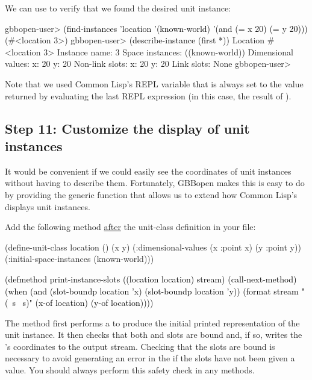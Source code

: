 \documentclass[10pt,twoside,english,pdftex]{article}
\begin{document}
%
%
We can use  to verify that we found the
desired  unit instance:
%
\W\supp
\begin{example}
\textcolor{darkergray}{%
  gbbopen-user> \textcolor{black}{(find-instances 'location '(known-world)
                  '(and (= x 20) (= y 20)))}
   (#<location 3>)
  gbbopen-user> \textcolor{black}{(describe-instance (first *))}
  Location #<location 3>
    Instance name: 3
    Space instances: ((known-world))
    Dimensional values:
      x:  20
      y:  20
    Non-link slots:
      x:  20
      y:  20
    Link slots: None
  gbbopen-user>}
\end{example}
%
Note that we used Common Lisp's REPL \code{*} variable that is always set to
the value returned by evaluating the last REPL expression (in this case, the
result of ).

\subsection*{Step 11: Customize the display of  unit instances}

%
%
It would be convenient if we could easily see the coordinates of
 unit instances without having to describe them.
Fortunately, GBBopen makes this is easy to do by providing the
 generic function that allows us to extend
how Common Lisp's  displays 
unit instances.

Add the following  method
\underline{after} the  unit-class definition in your
 file:
%
\W\supp
\begin{example}
\textcolor{darkergray}{%
  (define-unit-class location ()
    (x y)
    (:dimensional-values
      (x :point x)
      (y :point y))
    (:initial-space-instances (known-world)))

  \textcolor{black}{(defmethod print-instance-slots ((location location) stream)
    (call-next-method)
    (when (and (slot-boundp location 'x)
               (slot-boundp location 'y))
      (format stream " (~s ~s)"
              (x-of location)
              (y-of location))))}}
\end{example}
%
The method first performs a  to produce the
initial printed representation of the  unit instance.
It then checks that both  and  slots are bound and, if so,
writes the 's coordinates to the output stream.
Checking that the slots are bound is necessary to avoid generating an error in
the  if the slots have not been given a
value.  You should always perform this safety check in any
 methods.
\end{document}
